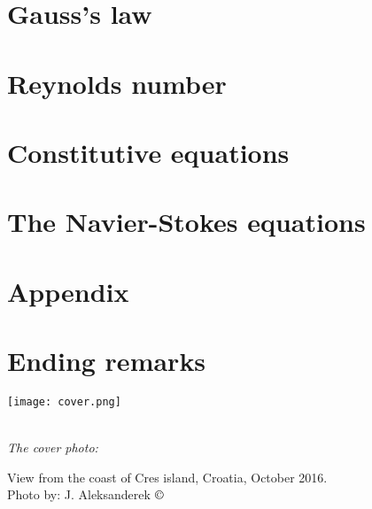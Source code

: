 \documentclass[12pt]{report}
\begin{document}
%

\chapter{Gauss's law}

%

\chapter{Reynolds number}

%

\chapter{Constitutive equations}

%

\chapter{The Navier-Stokes equations}

%





\chapter*{Appendix}

\newpage
\thispagestyle{empty}

\chapter*{Ending remarks}



\begin{flushright}


\texttt{[image: cover.png]}

\setlength{\parskip}{0.1em}
\setlength{\parindent}{0cm}
\ \\[0.5cm]
\textit{The cover photo:}  

View from the coast of Cres island, Croatia, October 2016.
\ \\[0.1cm]
Photo by: J. Aleksanderek $\copyright$
\end{flushright}





\end{document}

